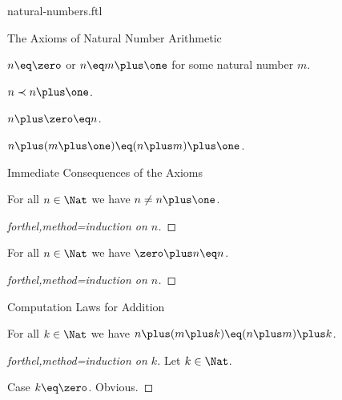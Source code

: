 \documentclass{naproche-library}
\begin{document}
\begin{smodule}[title=Natural Numbers]{natural-numbers.ftl}
\begin{sfragment}{The Axioms of Natural Number Arithmetic}
  \begin{axiom}[forthel,title=Peano Axiom III,id=NatNumberIsZeroOrSuccessorAx]
    $n\eq\zero$ or $n\eq m\plus\one$ for some natural number $m$.
  \end{axiom}

  \begin{axiom}[forthel,title=Induction Axiom,id=InductionAx]
    $n\prec n\plus\one$.
  \end{axiom}

  \begin{axiom}[forthel,title=Addition Axiom I,id=AdditionWithZeroAx]
    $n\plus\zero\eq n$.
  \end{axiom}

  \begin{axiom}[forthel,title=Addition Axiom II,id=AdditionWithSuccessorAx]
    $n\plus(m\plus\one)\eq(n\plus m)\plus\one$.
  \end{axiom}
\end{sfragment}

\begin{sfragment}{Immediate Consequences of the Axioms}
  \begin{proposition}[forthel,id=NatNumberIsNotItsOwnSuccessorProp]
    For all $n\in\Nat$ we have $n\neq n\plus\one$.
  \end{proposition}
  \begin{proof}[forthel,method=induction on $n$]\end{proof}

  \begin{proposition}[forthel,id=ZeroIsLeftIdentityOfPlusProp]
    For all $n\in\Nat$ we have $\zero\plus n\eq n$.
  \end{proposition}
  \begin{proof}[forthel,method=induction on $n$]\end{proof}
\end{sfragment}

\begin{sfragment}{Computation Laws for Addition}
  \begin{proposition}[forthel,title=Associativity,id=PlusIsAssociativeProp]
    For all $k\in\Nat$ we have $n\plus(m\plus k)\eq(n\plus m)\plus k$.
  \end{proposition}
  \begin{proof}[forthel,method=induction on $k$]
    Let $k\in\Nat$.

    Case $k\eq\zero$. Obvious.


\end{proof}
\end{sfragment}
\end{smodule}
\end{document}
